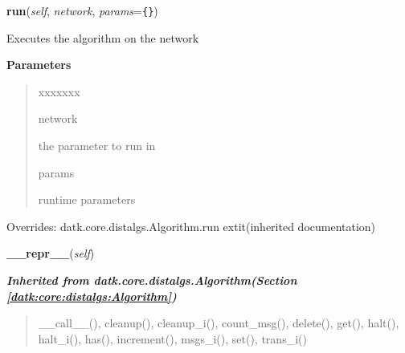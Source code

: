 \hspace{.8\funcindent}\begin{boxedminipage}{\funcwidth}

    \raggedright \textbf{run}(\textit{self}, \textit{network}, \textit{params}={\tt \texttt{\{}\texttt{\}}})

\setlength{\parskip}{2ex}
    Executes the algorithm on the network

\setlength{\parskip}{1ex}
      \textbf{Parameters}
      \vspace{-1ex}

      \begin{quote}
        \begin{Ventry}{xxxxxxx}

          \item[network]

          the parameter to run in

          \item[params]

          runtime parameters

        \end{Ventry}

      \end{quote}

      Overrides: datk.core.distalgs.Algorithm.run 	extit{(inherited documentation)}

    \end{boxedminipage}

    \label{datk:core:distalgs:Chain:__repr__}

    \vspace{0.5ex}

\hspace{.8\funcindent}\begin{boxedminipage}{\funcwidth}

    \raggedright \textbf{\_\_repr\_\_}(\textit{self})

\setlength{\parskip}{2ex}
\setlength{\parskip}{1ex}
    \end{boxedminipage}


\large{\textbf{\textit{Inherited from datk.core.distalgs.Algorithm\textit{(Section \ref{datk:core:distalgs:Algorithm})}}}}

\begin{quote}
\_\_call\_\_(), cleanup(), cleanup\_i(), count\_msg(), delete(), get(), halt(), halt\_i(), has(), increment(), msgs\_i(), set(), trans\_i()
\end{quote}

